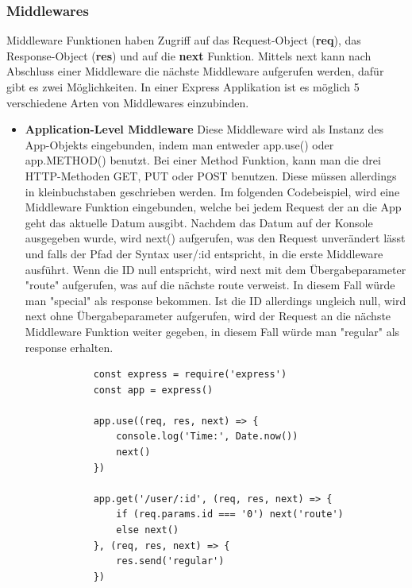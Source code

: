 \subsubsection{Middlewares}
Middleware Funktionen haben Zugriff auf das Request-Object (\textbf{req}), das Response-Object (\textbf{res}) und auf die \textbf{next} Funktion. Mittels next kann nach Abschluss einer Middleware die nächste Middleware aufgerufen werden, dafür gibt es zwei Möglichkeiten.
\newline
In einer Express Applikation ist es möglich 5 verschiedene Arten von Middlewares einzubinden.

\begin{itemize}

    \item \textbf{Application-Level Middleware}
        \newline
        Diese Middleware wird als Instanz des App-Objekts eingebunden, indem man entweder app.use() oder app.METHOD() benutzt. Bei einer Method Funktion, kann man die drei HTTP-Methoden GET, PUT oder POST benutzen. Diese müssen allerdings in kleinbuchstaben geschrieben werden.
        \newline
        Im folgenden Codebeispiel, wird eine Middleware Funktion eingebunden, welche bei jedem Request der an die App geht das aktuelle Datum ausgibt. Nachdem das Datum auf der Konsole ausgegeben wurde, wird next() aufgerufen, was den Request unverändert lässt und falls der Pfad der Syntax user/:id entspricht, in die erste Middleware ausführt. Wenn die ID null entspricht, wird next mit dem Übergabeparameter "route" aufgerufen, was auf die nächste route verweist. In diesem Fall würde man "special" als response bekommen. Ist die ID allerdings ungleich null, wird next ohne Übergabeparameter aufgerufen, wird der Request an die nächste Middleware Funktion weiter gegeben, in diesem Fall würde man "regular" als response erhalten.
        \begin{lstlisting}
            const express = require('express')
            const app = express()

            app.use((req, res, next) => {
                console.log('Time:', Date.now())
                next()
            })
    
            app.get('/user/:id', (req, res, next) => {
                if (req.params.id === '0') next('route')
                else next()
            }, (req, res, next) => {
                res.send('regular')
            })


\end{lstlisting}
\end{itemize}
